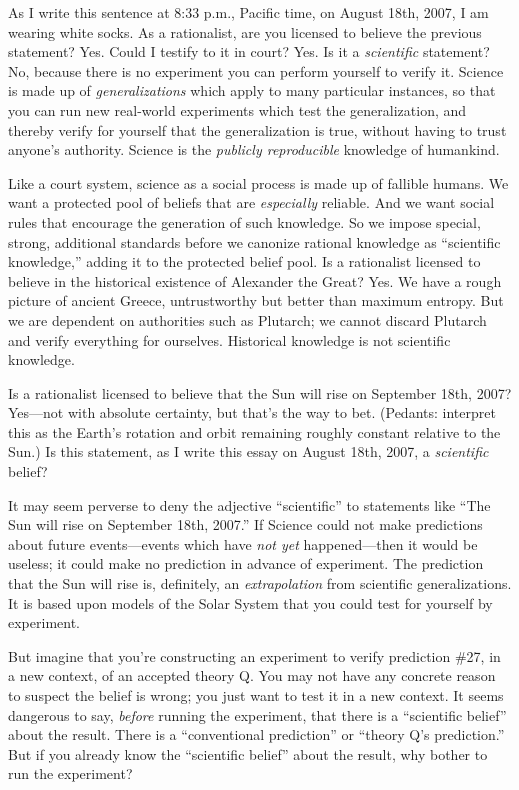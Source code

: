 {
 As I write this sentence at 8:33 p.m., Pacific time, on August
18th, 2007, I am wearing white socks. As a rationalist, are you
licensed to believe the previous statement? Yes. Could I testify to it
in court? Yes. Is it a \textit{scientific} statement? No, because there
is no experiment you can perform yourself to verify it. Science is made
up of \textit{generalizations} which apply to many particular
instances, so that you can run new real-world experiments which test
the generalization, and thereby verify for yourself that the
generalization is true, without having to trust
anyone's authority. Science is the \textit{publicly
reproducible} knowledge of humankind.}

{
 Like a court system, science as a social process is made up of
fallible humans. We want a protected pool of beliefs that are
\textit{especially} reliable. And we want social rules that encourage
the generation of such knowledge. So we impose special, strong,
additional standards before we canonize rational knowledge as
``scientific knowledge,'' adding it
to the protected belief pool. Is a rationalist licensed to believe in
the historical existence of Alexander the Great? Yes. We have a rough
picture of ancient Greece, untrustworthy but better than maximum
entropy. But we are dependent on authorities such as Plutarch; we
cannot discard Plutarch and verify everything for ourselves. Historical
knowledge is not scientific knowledge.}

{
 Is a rationalist licensed to believe that the Sun will rise on
September 18th, 2007? Yes---not with absolute certainty, but
that's the way to bet. (Pedants: interpret this as the
Earth's rotation and orbit remaining roughly constant
relative to the Sun.) Is this statement, as I write this essay on
August 18th, 2007, a \textit{scientific} belief?}

{
 It may seem perverse to deny the adjective
``scientific'' to statements like
``The Sun will rise on September 18th,
2007.'' If Science could not make predictions about
future events---events which have \textit{not yet} happened---then it
would be useless; it could make no prediction in advance of experiment.
The prediction that the Sun will rise is, definitely, an
\textit{extrapolation} from scientific generalizations. It is based
upon models of the Solar System that you could test for yourself by
experiment.}

{
 But imagine that you're constructing an experiment
to verify prediction \#27, in a new context, of an accepted theory Q.
You may not have any concrete reason to suspect the belief is wrong;
you just want to test it in a new context. It seems dangerous to say,
\textit{before} running the experiment, that there is a
``scientific belief'' about the
result. There is a ``conventional
prediction'' or ``theory
Q's prediction.'' But if you already
know the ``scientific belief'' about
the result, why bother to run the experiment?}

